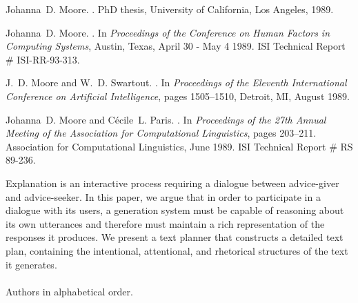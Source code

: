 \begin{thebibliography}{10}
Johanna~D. Moore.
.
\newblock PhD thesis, University of California, Los Angeles, 1989.

\noindent\hspace*{\itemindent}{\leftskip=0.1in\rightskip=0.1in\hrulefill}

Johanna~D. Moore.
.
\newblock In {\em Proceedings of the Conference on Human Factors in Computing
  Systems}, Austin, Texas, April 30 - May 4 1989.
\newblock ISI Technical Report \# ISI-RR-93-313.

\noindent\hspace*{\itemindent}{\leftskip=0.1in\rightskip=0.1in\hrulefill}

J.~D. Moore and W.~D. Swartout.
.
\newblock In {\em Proceedings of the Eleventh International Conference on
  Artificial Intelligence}, pages 1505--1510, Detroit, MI, August 1989.

\noindent\hspace*{\itemindent}{\leftskip=0.1in\rightskip=0.1in\hrulefill}

Johanna~D. Moore and C\'{e}cile~L. Paris.
.
\newblock In {\em Proceedings of the 27th Annual Meeting of the Association for
  Computational Linguistics}, pages 203--211. Association for Computational
  Linguistics, June 1989.
\newblock ISI Technical Report \# RS 89-236.

{\leftskip=0.1in\rightskip=0.1in\begin{small}\par{}Explanation is an interactive process requiring a dialogue between
  advice-giver and advice-seeker. In this paper, we argue that in order to
  participate in a dialogue with its users, a generation system must be capable
  of reasoning about its own utterances and therefore must maintain a rich
  representation of the responses it produces. We present a text planner that
  constructs a detailed text plan, containing the intentional, attentional, and
  rhetorical structures of the text it generates.\\ \\ Authors in alphabetical
  order.\end{small}\par}
\noindent\hspace*{\itemindent}{\leftskip=0.1in\rightskip=0.1in\hrulefill}


\end{thebibliography}
